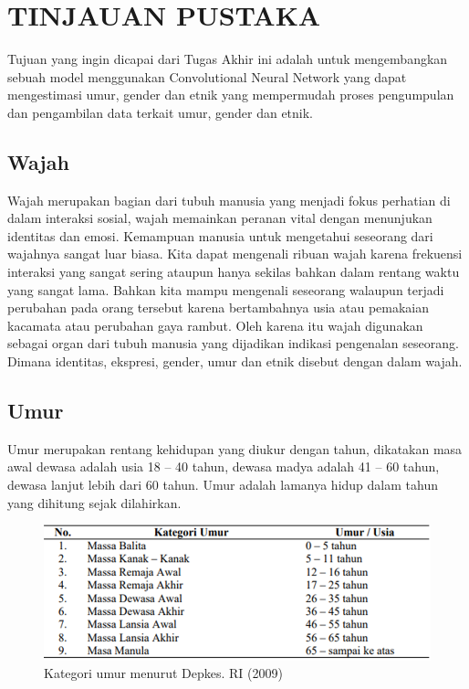 \section{TINJAUAN PUSTAKA}

Tujuan yang ingin dicapai dari Tugas Akhir ini adalah untuk mengembangkan sebuah model menggunakan 
Convolutional Neural Network yang dapat mengestimasi umur, gender dan etnik yang mempermudah proses 
pengumpulan dan pengambilan data terkait umur, gender dan etnik.

\subsection{Wajah}


Wajah merupakan bagian dari tubuh manusia yang menjadi fokus perhatian di dalam interaksi sosial, 
wajah memainkan peranan vital dengan menunjukan identitas dan emosi. Kemampuan manusia untuk mengetahui 
seseorang dari wajahnya sangat luar biasa. Kita dapat mengenali ribuan wajah karena frekuensi interaksi 
yang sangat sering ataupun hanya sekilas bahkan dalam rentang waktu yang sangat lama. Bahkan kita mampu 
mengenali seseorang walaupun terjadi perubahan pada orang tersebut karena bertambahnya usia atau 
pemakaian kacamata atau perubahan gaya rambut. Oleh karena itu wajah digunakan sebagai organ dari tubuh 
manusia yang dijadikan indikasi pengenalan seseorang. Dimana identitas, ekspresi, gender, umur dan etnik 
disebut dengan dalam wajah.

\subsection{Umur}
Umur merupakan rentang kehidupan yang diukur dengan tahun, dikatakan masa awal dewasa adalah usia 18 – 40 
tahun, dewasa madya adalah 41 – 60 tahun, dewasa lanjut lebih dari 60 tahun. Umur adalah lamanya hidup 
dalam tahun yang dihitung sejak dilahirkan\citep{MasaTubuh}.
\begin{figure} [H] \centering
    \includegraphics[scale=0.6]{gambar/umur.png}
    \caption{Kategori umur menurut Depkes. RI (2009)}
    \label{fig:Umur}
\end{figure}

